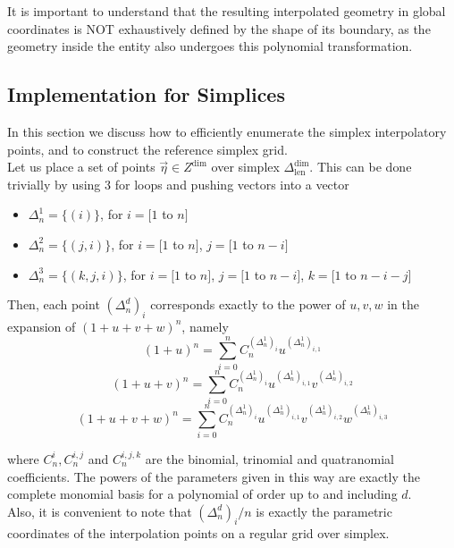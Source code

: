\noindent
It is important to understand that the resulting interpolated geometry in global coordinates is NOT exhaustively defined by the shape of its boundary, as the geometry inside the entity also undergoes this polynomial transformation.


\subsection{Implementation for Simplices}
\label{subsection-simplexgrid}

\noindent
In this section we discuss how to efficiently enumerate the simplex interpolatory points, and to construct the reference simplex grid. \\

\noindent
Let us place a set of points $\vec{\eta} \in Z^{\dim}$ over simplex $\Delta^{\dim}_{\mathrm{len}}$. This can be done trivially
by using 3 for loops and pushing vectors into a vector
\begin{itemize}
	\item $\Delta^{1}_n = \{(i)\}$, for $i = [1$ to $n]$
	\item $\Delta^{2}_n = \{(j,i)\}$, for $i = [1$ to $n]$, $j = [1$ to $n - i]$
	\item $\Delta^{3}_n = \{(k,j,i)\}$, for $i = [1$ to $n]$, $j = [1$ to $n - i]$, $k = [1$ to $n - i - j]$
\end{itemize}

\noindent
Then, each point $(\Delta^{d}_n)_i$ corresponds exactly to the power of $u,v,w$ in the expansion of $(1 + u + v + w)^n$, namely
\[ (1 + u)^n = \sum_{i=0}^n C^{(\Delta^{1}_n)_i}_n u^{(\Delta^{1}_n)_{i,1}} \]
\[ (1 + u + v)^n = \sum_{i=0}^n C^{(\Delta^{1}_n)_i}_n u^{(\Delta^{1}_n)_{i,1}} v^{(\Delta^{1}_n)_{i,2}} \]
\[ (1 + u + v + w)^n = \sum_{i=0}^n C^{(\Delta^{1}_n)_i}_n u^{(\Delta^{1}_n)_{i,1}} v^{(\Delta^{1}_n)_{i,2}} w^{(\Delta^{1}_n)_{i,3}} \]

\noindent
where $C^{i}_n, C^{i,j}_n$ and $C^{i,j,k}_n$ are the binomial, trinomial and quatranomial coefficients. The powers of the parameters given in this way are exactly the complete monomial basis for a polynomial of order up to and including $d$. \\

\noindent
Also, it is convenient to note that $(\Delta^{d}_n)_i / n$ is exactly the parametric coordinates of the interpolation points on a regular grid over simplex. 

